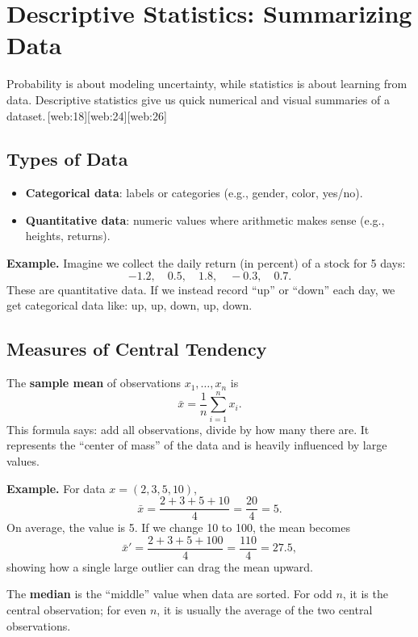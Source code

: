 \documentclass[11pt,a4paper]{article}
\begin{document}
\newpage

\section{Descriptive Statistics: Summarizing Data}

Probability is about modeling uncertainty, while statistics is about learning from data. 
Descriptive statistics give us quick numerical and visual summaries of a dataset.\,[web:18][web:24][web:26]

\subsection{Types of Data}

\begin{itemize}
    \item \textbf{Categorical data}: labels or categories (e.g., gender, color, yes/no).
    \item \textbf{Quantitative data}: numeric values where arithmetic makes sense (e.g., heights, returns).
\end{itemize}

\textbf{Example.}  
Imagine we collect the daily return (in percent) of a stock for 5 days:
\[
-1.2,\quad 0.5,\quad 1.8,\quad -0.3,\quad 0.7.
\]
These are quantitative data.  
If we instead record ``up'' or ``down'' each day, we get categorical data like: up, up, down, up, down.

\subsection{Measures of Central Tendency}

The \textbf{sample mean} of observations \(x_1,\dots,x_n\) is
\[
\bar{x} = \frac{1}{n}\sum_{i=1}^{n} x_i.
\]
This formula says: add all observations, divide by how many there are.  
It represents the ``center of mass'' of the data and is heavily influenced by large values.

\textbf{Example.}  
For data \(x = (2, 3, 5, 10)\),
\[
\bar{x} = \frac{2 + 3 + 5 + 10}{4} = \frac{20}{4} = 5.
\]
On average, the value is 5.  
If we change 10 to 100, the mean becomes
\[
\bar{x}' = \frac{2 + 3 + 5 + 100}{4} = \frac{110}{4} = 27.5,
\]
showing how a single large outlier can drag the mean upward.

The \textbf{median} is the ``middle'' value when data are sorted. 
For odd \(n\), it is the central observation; for even \(n\), it is usually the average of the two central observations.
\end{document}
